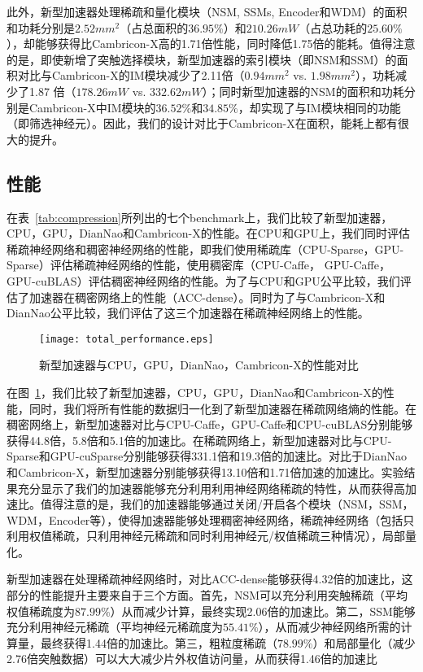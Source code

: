 此外，新型加速器处理稀疏和量化模块（NSM, SSMs, Encoder和WDM）的面积和功耗分别是$2.52mm^2$（占总面积的$36.95\%$）和$210.26mW$（占总功耗的$25.60\%$），却能够获得比Cambricon-X高的1.71倍性能，同时降低1.75倍的能耗。值得注意的是，即使新增了突触选择模块，新型加速器的索引模块（即NSM和SSM）的面积对比与Cambricon-X的IM模块减少了2.11倍（$0.94mm^2$ vs. $1.98mm^2$），功耗减少了1.87 倍（$178.26mW$ vs. $332.62mW$）；同时新型加速器的NSM的面积和功耗分别是Cambricon-X中IM模块的$36.52\%$和$34.85\%$，却实现了与IM模块相同的功能（即筛选神经元）。因此，我们的设计对比于Cambricon-X在面积，能耗上都有很大的提升。

\subsection{性能}
在表~\ref{tab:compression}所列出的七个benchmark上，我们比较了新型加速器，CPU，GPU，DianNao和Cambricon-X的性能。在CPU和GPU上，我们同时评估稀疏神经网络和稠密神经网络的性能，即我们使用稀疏库（CPU-Sparse，GPU-Sparse）评估稀疏神经网络的性能，使用稠密库（CPU-Caffe， GPU-Caffe， GPU-cuBLAS）评估稠密神经网络的性能。为了与CPU和GPU公平比较，我们评估了加速器在稠密网络上的性能（ACC-dense）。同时为了与Cambricon-X和DianNao公平比较，我们评估了这三个加速器在稀疏神经网络上的性能。

\begin{figure}[h]
\centering
\texttt{[image: total\_performance.eps]}
\caption{新型加速器与CPU，GPU，DianNao，Cambricon-X的性能对比}
\label{fig:total_performance}
\end{figure}

在图~\ref{fig:total_performance}，我们比较了新型加速器，CPU，GPU，DianNao和Cambricon-X的性能，同时，我们将所有性能的数据归一化到了新型加速器在稀疏网络熵的性能。在稠密网络上，新型加速器对比与CPU-Caffe，GPU-Caffe和CPU-cuBLAS分别能够获得44.8倍，5.8倍和5.1倍的加速比。在稀疏网络上，新型加速器对比与CPU-Sparse和GPU-cuSparse分别能够获得331.1倍和19.3倍的加速比。对比于DianNao和Cambricon-X，新型加速器分别能够获得13.10倍和1.71倍加速的加速比。实验结果充分显示了我们的加速器能够充分利用利用神经网络稀疏的特性，从而获得高加速比。值得注意的是，我们的加速器能够通过关闭/开启各个模块（NSM，SSM，WDM，Encoder等），使得加速器能够处理稠密神经网络，稀疏神经网络（包括只利用权值稀疏，只利用神经元稀疏和同时利用神经元/权值稀疏三种情况），局部量化。

新型加速器在处理稀疏神经网络时，对比ACC-dense能够获得4.32倍的加速比，这部分的性能提升主要来自于三个方面。首先，NSM可以充分利用突触稀疏（平均权值稀疏度为$87.99\%$）从而减少计算，最终实现2.06倍的加速比。第二，SSM能够充分利用神经元稀疏（平均神经元稀疏度为$55.41\%$），从而减少神经网络所需的计算量，最终获得1.44倍的加速比。第三，粗粒度稀疏（$78.99\%$）和局部量化（减少2.76倍突触数据）可以大大减少片外权值访问量，从而获得1.46倍的加速比

